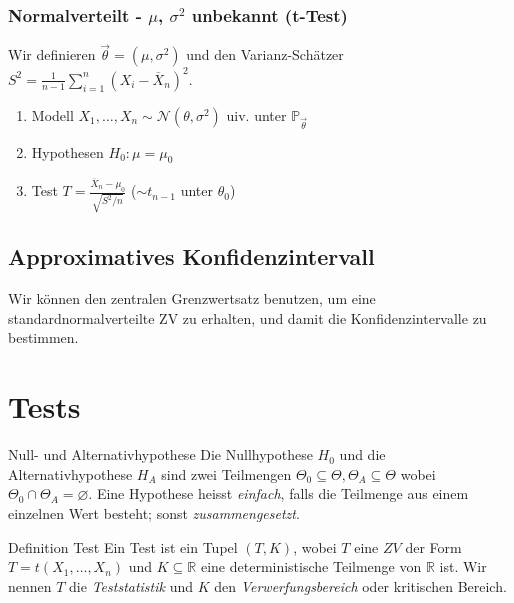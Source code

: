 \documentclass[a4paper,10pt]{article}
\def\R{\mathbb{R}}
\def\P{\mathbb{P}}
\begin{document}
\subsubsection*{\texorpdfstring{Normalverteilt - \(\mu\), \(\sigma^2\) unbekannt (t-Test)}{Normalverteilt - μ, σ² unbekannt (t-Test)}}
Wir definieren \(\vec{\theta} = (\mu, \sigma^2)\) und den Varianz-Schätzer \(S^2 = \frac{1}{n-1}\sum_{i=1}^n (X_i - \overline{X}_n)^2\).
\begin{enumerate}
	\item Modell \(X_1, \ldots, X_n \sim \mathcal{N}(\theta, \sigma^2)\) uiv. unter \(\P_{\vec{\theta}}\)
	\item Hypothesen $H_0: \mu = \mu_0$
	\item Test \(T = \frac{\overline{X}_n - \mu_0}{\sqrt{S^2/n}}\) ($\sim t_{n-1}$ unter $\theta_0$)
\end{enumerate}

\subsection{Approximatives Konfidenzintervall}
Wir können den zentralen Grenzwertsatz benutzen, um eine standardnormalverteilte ZV zu erhalten, und damit die Konfidenzintervalle zu bestimmen.

\section{Tests}
\begin{subbox}{Null- und Alternativhypothese}
	Die Nullhypothese \(H_0\) und die Alternativhypothese \(H_A\) sind zwei Teilmengen \(\Theta_0 \subseteq \Theta, \Theta_A \subseteq \Theta\) wobei \(\Theta_0 \cap \Theta_A = \varnothing\). Eine Hypothese heisst \textit{einfach}, falls die Teilmenge aus einem einzelnen Wert besteht; sonst \textit{zusammengesetzt}.
\end{subbox}

\begin{mainbox}{Definition Test}
	Ein Test ist ein Tupel \((T,K)\), wobei \(T\) eine \(ZV\) der Form \(T=t(X_1, \ldots, X_n)\) und \(K \subseteq \R\) eine deterministische Teilmenge von \(\R\) ist. Wir nennen \(T\) die \textit{Teststatistik} und \(K\) den \textit{Verwerfungsbereich} oder kritischen Bereich.
\end{mainbox}
\end{document}
